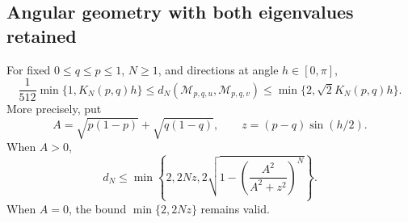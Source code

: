 \subsection{Angular geometry with both eigenvalues retained}
\begin{theorem}
\label{thm:biasedangular75}
For fixed $0\le q\le p\le1$, $N\ge1$, and directions at angle
$h\in[0,\pi]$,
\begin{equation}\label{eq:biasedangular75}
 \frac1{512}\min\{1,K_N(p,q)h\}
 \le d_N(\mathcal M_{p,q,u},\mathcal M_{p,q,v})
 \le\min\{2,\sqrt2 K_N(p,q)h\}.
\end{equation}
More precisely, put
\[
 A=\sqrt{p(1-p)}+\sqrt{q(1-q)},\qquad
 z=(p-q)\sin(h/2).
\]
When $A>0$,
\begin{equation}\label{eq:biasedfiniteupper75}
 d_N\le\min\left\{2,2Nz,
       2\sqrt{1-\left(\frac{A^2}{A^2+z^2}\right)^N}\right\}.
\end{equation}
When $A=0$, the bound $\min\{2,2Nz\}$ remains valid.
\end{theorem}
